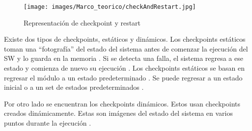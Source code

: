 \begin{comment}
\begin{figure}[h]
  \centering
  \begin{tikzpicture}
  \tikzstyle{cuadro} = [draw, sep=5,rectangle,minimum height=3em, minimum width=6em, node 
  distance=2cm] 

  \tikzstyle{vacio} = [inner, sep=5,rectangle,minimum height=3em, minimum width=6em, node 
  distance=3cm] 

  \tikzstyle{circulo} = [fill, shape=circle, minimum size=5pt, inner sep=3pt, node distance=4cm ]
  
  \node[cuadro] (checkMemo){Memoria de Checkpoint};
  \node[cuadro , below of=checkMemo, pin={[->] left:Entrada}] (modulo){Módulo en ejecución};
  \node[circulo, right of=modulo] (circ){};
  \node[cuadro, below of=circ] (detector){Test de aceptación};
  \node[vacio, right of = circ] (salida){Salida};

  \draw[->] (checkMemo.-30)--(modulo.30);
  \draw[->] (modulo.150) -- (checkMemo.-150);
  \draw[->] (modulo)--(circ);
  \draw[->] (circ)--(salida);
  \draw[->] (circ)--(detector);
  \draw[->] (detector)-|(modulo) node[near end, left] {retry};
  \end{tikzpicture}
  \caption{Representación de checkpoint y restart}
  \label{fig:checkAndRestart}
\end{figure}
\end{comment}

\begin{figure}[h]
 \centering
 \texttt{[image: images/Marco\_teorico/checkAndRestart.jpg]}
 \caption{Representación de checkpoint y restart}
 \label{fig:checkAndRestart}
\end{figure} 


Existe dos tipos de checkpoints, estáticos y dinámicos. Los checkpoints estáticos toman una 
``fotografía'' del estado del sistema antes de comenzar la ejecución del \ac{SW} y lo guarda en la
memoria \citep{FTDesign}. Si se detecta una falla, el sistema regresa a ese estado y 
comienza de nuevo su ejecución \citep{FTDesign}. Los checkpoints estáticos se basan en regresar el 
módulo a un estado predeterminado \citep{SoftwareFaultToleranceATutorial}. Se puede regresar a un 
estado inicial o a un set de estados predeterminados \citep{SoftwareFaultToleranceATutorial}.

Por otro lado se encuentran los checkpoints dinámicos. Estos usan checkpoints creados 
dinámicamente. Estas son imágenes del estado del sistema en varios puntos durante la ejecución 
\citep{SoftwareFaultToleranceATutorial}.

